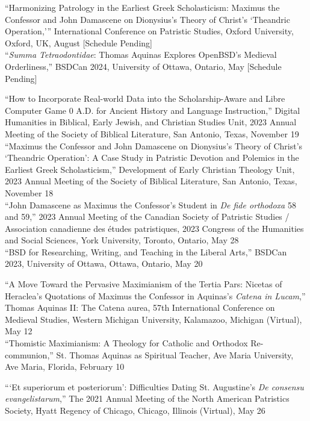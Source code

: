 \documentclass[letterpaper,12pt]{article}
\newcommand{\years}[1]{%
  {\reversemarginpar\strut\marginnote{{\small#1}}}%
}
\begin{document}
{{{{{{{\years{2024}%
%
``Harmonizing Patrology in the Earliest Greek Scholasticism: Maximus the Confessor and John Damascene on Dionysius's Theory of Christ's `Theandric Operation,''' International Conference on Patristic Studies, Oxford University, Oxford, UK, August [Schedule Pending] \\ [.3cm]
%
``\emph{Summa Tetraodontidae}: Thomas Aquinas Explores OpenBSD's Medieval Orderliness,'' BSDCan 2024, University of Ottawa, Ontario, May [Schedule Pending] \\ [.3cm]
%
\years{2023}%
%
``How to Incorporate Real-world Data into the Scholarship-Aware and Libre Computer Game 0 A.D. for Ancient History and Language Instruction,'' Digital Humanities in Biblical, Early Jewish, and Christian Studies Unit, 2023 Annual Meeting of the Society of Biblical Literature, San Antonio, Texas, November 19  \\ [.3cm]
%
``Maximus the Confessor and John Damascene on Dionysius's Theory of Christ's `Theandric Operation': A Case Study in Patristic Devotion and Polemics in the Earliest Greek Scholasticism,'' Development of Early Christian Theology Unit, 2023 Annual Meeting of the Society of Biblical Literature, San Antonio, Texas, November 18  \\ [.3cm]
%
``John Damascene as Maximus the Confessor's Student in \emph{De fide orthodoxa} 58 and 59,'' 2023 Annual Meeting of the Canadian Society of Patristic Studies / Association canadienne des études patristiques, 2023 Congress of the Humanities and Social Sciences, York University, Toronto, Ontario, May 28  \\ [.3cm]
%
``BSD for Researching, Writing, and Teaching in the Liberal Arts,'' BSDCan 2023, University of Ottawa, Ottawa, Ontario, May 20  \\ [.3cm]
%
\years{2022}%
%
``A Move Toward the Pervasive Maximianism of the Tertia Pars: Nicetas of Heraclea's Quotations of Maximus the Confessor in Aquinas's \emph{Catena in Lucam},'' Thomas Aquinas II: The Catena aurea, 57th International Conference on Medieval Studies, Western Michigan University, Kalamazoo, Michigan (Virtual), May 12 \\ [.3cm]
%
``Thomistic Maximianism: A Theology for Catholic and Orthodox Re-communion,'' St. Thomas Aquinas as Spiritual Teacher, Ave Maria University, Ave Maria, Florida, February 10 \\ [.3cm]
%
\years{2021}%
%
```Et superiorum et posteriorum': Difficulties Dating St. Augustine's \emph{De consensu evangelistarum},'' The 2021 Annual Meeting of the North American Patristics Society, Hyatt Regency of Chicago, Chicago, Illinois (Virtual), May 26 \\ [.3cm]
}}}}}}}
\end{document}
